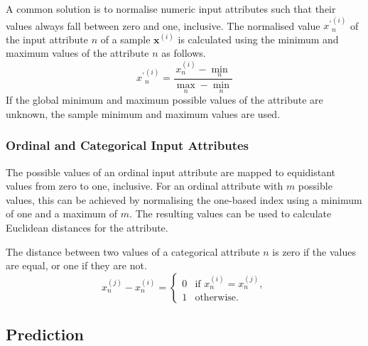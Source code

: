 A common solution is to normalise numeric input attributes such that their values always fall between zero and one, inclusive.
The normalised value \( {x^{\prime}}_{n}^{(i)} \) of the input attribute \( n \) of a sample \( \boldsymbol{x}^{(i)} \) is calculated using the minimum and maximum values of the attribute \( n \) as follows.
\begin{equation*}
  {x^{\prime}}_{n}^{(i)} = \frac{x_{n}^{(i)} - \min_{n}}{\max_{n} - \min_{n}}
\end{equation*}
If the global minimum and maximum possible values of the attribute are unknown, the sample minimum and maximum values are used.

\subsubsection{Ordinal and Categorical Input Attributes}

The possible values of an ordinal input attribute are mapped to equidistant values from zero to one, inclusive.
For an ordinal attribute with \( m \) possible values, this can be achieved by normalising the one-based index using a minimum of one and a maximum of \( m \).
The resulting values can be used to calculate Euclidean distances for the attribute.

The distance between two values of a categorical attribute \( n \) is zero if the values are equal, or one if they are not.
\begin{equation*}
  x_{n}^{(j)} - x_{n}^{(i)} = \begin{cases}
    0 & \text{if } x_{n}^{(i)} = x_{n}^{(j)}, \\
    1 & \text{otherwise}.
  \end{cases}
\end{equation*}

\subsection{Prediction}

